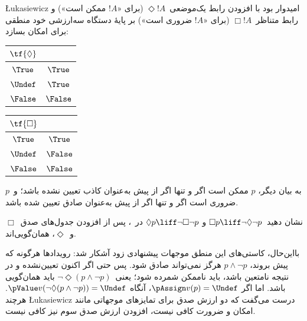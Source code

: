 \documentclass[../../../include/open-logic-section]{subfiles}
\begin{document}
\L ukasiewicz امیدوار بود با افزودن رابط یک‌موضعی~$\Diamond !A$ (برای
«$!A$ ممکن است») و رابط متناظر~$\Box !A$ (برای «$!A$ ضروری است») بر
پایهٔ دستگاه سه‌ارزشی خود منطقی برای امکان بسازد:
\begin{center}
  \begin{tabular}{c|c} 
    $\tf{\Diamond}$ & \\ 
    \hline  
    $\True$ & $\True$ \\ 
    $\Undef$ & $\True$ \\
    $\False$ & $\False$ 
  \end{tabular}
  \quad
  \begin{tabular}{c|c} 
    $\tf{\Box}$ & \\ 
    \hline  
    $\True$ & $\True$ \\ 
    $\Undef$ & $\False$ \\
    $\False$ & $\False$ 
  \end{tabular}
\end{center}
به بیان دیگر، $p$ ممکن است اگر و تنها اگر از پیش به‌عنوان کاذب تعیین
نشده باشد؛ و~$p$ ضروری است اگر و تنها اگر از پیش به‌عنوان صادق تعیین
شده باشد.

\begin{prob}
  نشان دهید~$\Box p \liff \lnot\Diamond \lnot p$ و
  $\Diamond p \liff \lnot \Box \lnot p$ در~\LogLuk[3]، پس از افزودن
  جدول‌های صدق~$\Box$ و~$\Diamond$، همان‌گویی‌اند.
\end{prob}

بااین‌حال، کاستی‌های این منطق موجهات پیشنهادی زود آشکار شد: رویدادها
هرگونه که پیش بروند، $p \land \lnot p$ هرگز نمی‌تواند صادق شود. پس حتی
اگر اکنون تعیین‌نشده و در نتیجه نامتعین باشد، باید ناممکن شمرده شود؛
یعنی~$\lnot \Diamond(p \land \lnot p)$ باید همان‌گویی باشد. اما اگر
$\pAssign v(p) = \Undef$، آنگاه
$\pValue v(\lnot \Diamond(p \land \lnot p)) = \Undef$. هرچند
\L ukasiewicz درست می‌گفت که دو ارزش صدق برای تمایزهای موجهاتی مانند
امکان و ضرورت کافی نیست، افزودن ارزش صدق سوم نیز کافی نیست.
\end{document}
